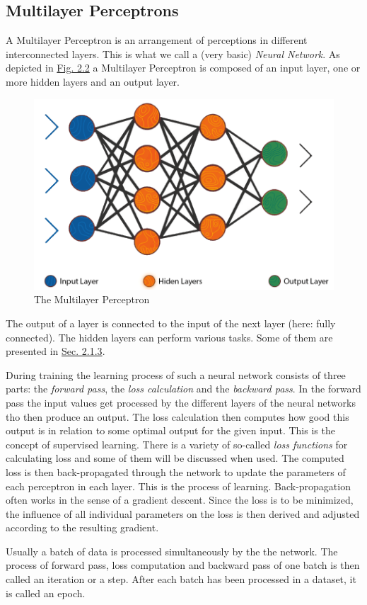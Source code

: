 \subsection{Multilayer Perceptrons} \label{sec:2.1.2}
A Multilayer Perceptron is an arrangement of perceptions in different interconnected layers. This is what we call a (very basic) \textit{Neural Network}. As depicted in \hyperref[fig:2.2]{Fig. 2.2} a Multilayer Perceptron is composed of an input layer, one or more hidden layers and an output layer. 
%
\begin{figure} \label{fig:2.2}
    \centering
    \includegraphics[width=.5\textwidth]{Chapters/figures/multilayer_perceptron.PNG}
    \caption{The Multilayer Perceptron}
\end{figure}
%
The output of a layer is connected to the input of the next layer (here: fully connected). The hidden layers can perform various tasks. Some of them are presented in \hyperref[sec:2.1.3]{Sec. 2.1.3}.

During training the learning process of such a neural network consists of three parts: the \textit{forward pass}, the \textit{loss calculation} and the \textit{backward pass}. In the forward pass the input values get processed by the different layers of the neural networks tho then produce an output. The loss calculation then computes how good this output is in relation to some optimal output for the given input. This is the concept of supervised learning. There is a variety of so-called \textit{loss functions} for calculating loss and some of them will be discussed when used. The computed loss is then back-propagated through the network to update the parameters of each perceptron in each layer. This is the process of learning. Back-propagation often works in the sense of a gradient descent. Since the loss is to be minimized, the influence of all individual parameters on the loss is then derived and adjusted according to the resulting gradient. 

Usually a batch of data is processed simultaneously by the the network. The process of forward pass, loss computation and backward pass of one batch is then called an iteration or a step. After each batch has been processed in a dataset, it is called an epoch.
%
